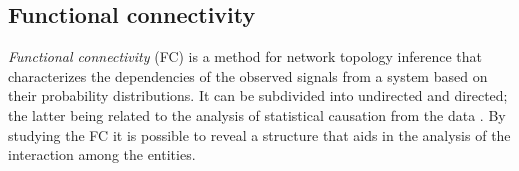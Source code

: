 \subsection{Functional connectivity}

\emph{Functional connectivity} (FC) is a method for network topology inference that characterizes the dependencies of the observed signals from a system based on their probability distributions\cite{Friston2011Functionaleffectiveconnectivity}. It can be subdivided into undirected and directed; the latter being related to the analysis of statistical causation from the data \cite{Bastos2016tutorialreviewfunctional}. By studying the FC  it is possible to reveal a structure that aids in the analysis of the interaction among the entities.

